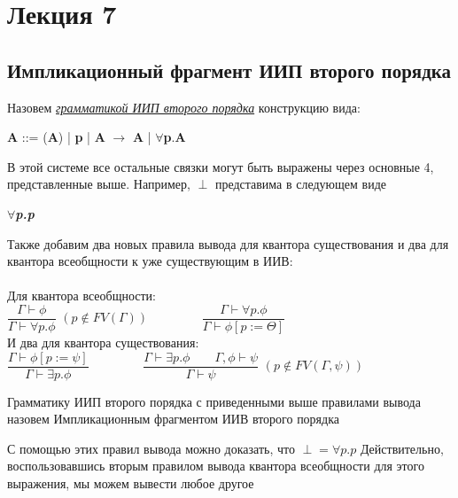\section{Лекция 7}
	\subsection{Импликационный фрагмент ИИП второго порядка}
 	\begin{center}
 		\begin{definition}
 			\large Назовем \textit{\underline{грамматикой ИИП второго порядка}} конструкцию вида: 
 		\end{definition}
 	\textbf{A} ::= 
 	(\textbf{A}) |
 	\textbf{p} |
 	\textbf{A} $\rightarrow$ \textbf{A} |
 	$\forall$\textbf{p}.\textbf{A} 
 	
 	\end{center}
 
 	\large В этой системе все остальные связки могут быть выражены через основные 4, представленные выше. Например, $\perp$ представима в следующем виде
 	\begin{center}
 		{\textbf{\textsl\textit{\large $\forall$p.p}}} \\
 	\end{center}
 	
 	
 	 Также добавим два новых правила вывода для квантора существования и два для квантора всеобщности к уже существующим в ИИВ: \\ \\
 	
	Для квантора всеобщности: \\ 
 	
 	\Large{$\dfrac{\Gamma\vdash\phi}{\Gamma\vdash\forall p.\phi}$} \Large$(p\notin FV(\Gamma)) \qquad\qquad$ 
 	\Large{$\dfrac{\Gamma\vdash\forall p.\phi}{\Gamma\vdash\phi[p:=\Theta]}$}	\\
 	
 	 И два для квантора существования: \\
 	
 	\Large{$\dfrac{\Gamma\vdash\phi[p:= \psi]}{\Gamma\vdash\exists p.\phi}\qquad\qquad$} 
 	\Large{$\dfrac{\Gamma\vdash\exists p.\phi\qquad\Gamma, \phi\vdash\psi}{\Gamma\vdash\psi}$} \Large$(p\notin FV(\Gamma, \psi))$ \\ 
 	
 	
 	\begin{definition}
 		\large Грамматику ИИП второго порядка с приведенными выше правилами вывода назовем Импликационным фрагментом ИИВ второго порядка\\ 
 	\end{definition}
	\large {С помощью этих правил вывода можно доказать, что \textbf{${\perp = \forall p.p}$}
		Действительно, воспользовавшись вторым правилом вывода квантора всеобщности для этого выражения, мы можем вывести любое другое}
 	
